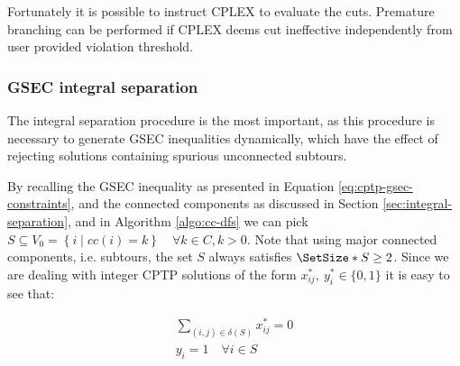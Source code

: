 Fortunately it is possible to instruct CPLEX to evaluate the cuts.
Premature branching can be performed if CPLEX deems cut ineffective independently
from user provided violation threshold.



\subsubsection{GSEC integral separation}
\label{sec:impl-gsec-integral-separation}

The integral separation procedure is the most important, as this procedure is necessary to generate GSEC inequalities dynamically, which have the effect of rejecting solutions containing spurious unconnected subtours.


By recalling the GSEC inequality as presented in Equation \eqref{eq:cptp-gsec-constraints}, and the connected components as discussed in Section \ref{sec:integral-separation}, and in Algorithm \ref{algo:cc-dfs} we can pick $S \subseteq V_0 = \left\{ i \mid cc(i) = k  \right\}   \quad \forall k \in C, k > 0$.
Note that using major connected components, i.e. subtours, the set $S$ always satisfies $\SetSize*{S} \ge 2$.
Since we are dealing with integer CPTP solutions of the form $x^*_{ij},\ y^*_{i} \in \{0, 1\}$ it is easy to see that:

\begin{align}
	\sum_{(i, j) \in \delta(S)} x^*_{ij} = 0 \\
	y_i =  1 \quad \forall i \in S
\end{align}

